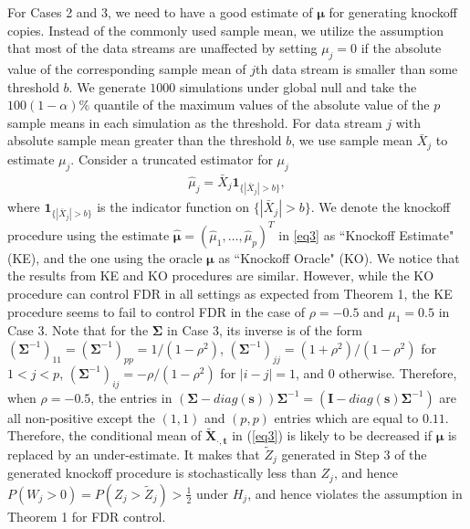 \documentclass[a4paper,12pt]{article}
\begin{document}
For Cases 2 and 3, we need to have a good estimate of $\bm\mu$ for generating knockoff copies. Instead of the commonly used sample mean, we utilize the assumption that most of the data streams are unaffected by setting $\mu_j=0$ if the absolute value of the corresponding sample mean of $j$th data stream is smaller than some threshold $b$. We generate $1000$ simulations under global null and take the $100(1-\alpha)\%$ quantile of the maximum values of the absolute value of the $p$ sample means in each simulation as the threshold. For data stream $j$ with absolute sample mean greater than the threshold $b$, we use sample mean $\bar{X}_j$ to estimate $\mu_j$. Consider a truncated estimator for $\mu_j$
\begin{align}
\hat{\mu}_j=\bar{X}_j\mathbf{1}_{\{ |\bar{X}_j|>b \}},\label{truncated mu}
\end{align} 
where $\mathbf{1}_{\{ |\bar{X}_j|>b \}}$ is the indicator function on $\{ |\bar{X}_j|>b \}$. We denote the knockoff procedure using the estimate $\hat{\bm\mu}=(\hat{\mu}_1,\ldots,\hat{\mu}_p)^T$ in \eqref{eq3} as ``Knockoff Estimate" (KE), and the one using the oracle $\bm\mu$ as ``Knockoff Oracle" (KO). We notice that the results from KE and KO procedures are similar. However, while the KO procedure can control FDR in all settings as expected from Theorem 1, the KE procedure seems to fail to control FDR in the case of $\rho=-0.5$ and $\mu_1=0.5$ in Case 3. Note that for the $\bm\Sigma$ in Case 3, its inverse is of the form $(\bm\Sigma^{-1})_{11}=(\bm\Sigma^{-1})_{pp}=1/(1-\rho^2)$, $(\bm\Sigma^{-1})_{jj}=(1+\rho^2)/(1-\rho^2)$ for $1<j<p$, $(\bm\Sigma^{-1})_{ij}=-\rho/(1-\rho^2)$ for $|i-j|=1$, and 0 otherwise. Therefore, when $\rho=-0.5$, the entries in $(\bm \Sigma - diag (\bm s)) \bm \Sigma^{-1} = (\bm I - diag(\bm s) \bm \Sigma^{-1})$ are all non-positive except the $(1,1)$ and $(p,p)$ entries which are equal to $0.11$. Therefore, the conditional mean of $\bm{\tilde X_{\cdot, t}}$ in (\ref{eq3}) is likely to be decreased if $\bm \mu$ is replaced by an under-estimate. It makes that $\tilde Z_j$ generated in Step 3 of the generated knockoff procedure is stochastically less than $Z_j$, and hence $P(W_j > 0) = P(Z_j > \tilde Z_j) > \frac{1}{2}$ under $H_j$, and hence violates the assumption in Theorem 1 for FDR control.
\end{document}

